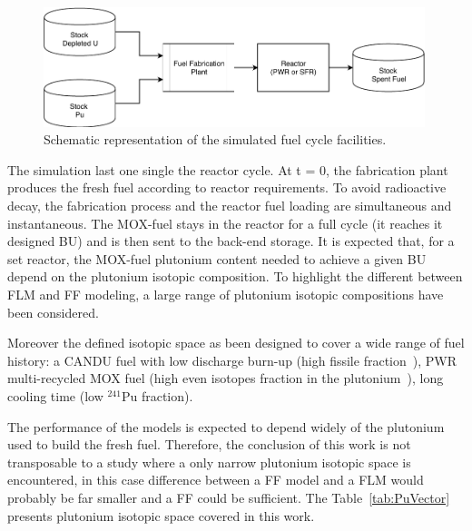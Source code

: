 \begin{figure}[h]
    \begin{center}
        \includegraphics[width = 0.99\textwidth]{FIG/FuelCycleDiagram.pdf}
        \caption{Schematic representation of the simulated fuel cycle facilities.}
        \label{fig:FuelCycle}
    \end{center}
\end{figure}

The simulation last one single the reactor cycle.
At t = 0, the fabrication plant produces the fresh fuel according to reactor requirements.
To avoid radioactive decay, the fabrication process and the reactor fuel loading are simultaneous and instantaneous.
The MOX-fuel stays in the reactor for a full cycle (it reaches it designed \gls{BU}) and is then sent to the back-end storage.
It is expected that, for a set reactor, the MOX-fuel plutonium content needed to achieve a given \gls{BU} depend on the plutonium isotopic composition.
To highlight the different between \gls{FLM} and \gls{FF} modeling, a large range of plutonium isotopic compositions have been considered.

Moreover the defined isotopic space as been designed to cover a wide range of fuel history: a CANDU fuel with low discharge burn-up (high fissile fraction~\cite{Guillemin_2010}), \gls{PWR} multi-recycled MOX fuel (high even isotopes fraction in the plutonium~\cite{Courtin_2016}), long cooling time (low $^{241}$Pu fraction).

The performance of the models is expected to depend widely of the plutonium used to build the fresh fuel.
Therefore, the conclusion of this work is not transposable to a study where a only narrow plutonium isotopic space is encountered, in this case difference between a \gls{FF} model  and a \gls{FLM} would probably be far smaller and a \gls{FF} could be sufficient.
The Table~\ref{tab:PuVector} presents plutonium isotopic space covered in this work.

